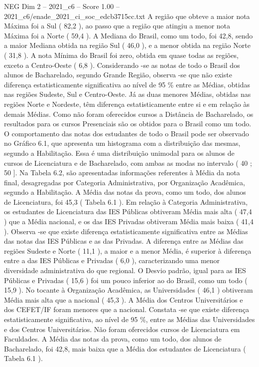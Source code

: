 \begin{textsample}{NEG Dim 2 – 2021\_c6 – Score 1.00 – 2021\_c6/enade\_2021\_ci\_soc\_edcb3715cc.txt}
A região que obteve a maior nota Máxima foi a Sul ( 82,2 ), ao passo que a região que atingiu a menor nota Máxima foi a Norte ( 59,4 ).
A Mediana do Brasil, como um todo, foi 42,8, sendo a maior Mediana obtida na região Sul ( 46,0 ), e a menor obtida na região Norte ( 31,8 ).
A nota Mínima do Brasil foi zero, obtida em quase todas as regiões, exceto a Centro-Oeste ( 6,8 ).
Considerando -se as notas de todo o Brasil dos alunos de Bacharelado, segundo Grande Região, observa -se que não existe diferença estatisticamente significativa ao nível de 95 \% entre as Médias, obtidas nas regiões Sudeste, Sul e Centro-Oeste.
Já as duas menores Médias, obtidas nas regiões Norte e Nordeste, têm diferença estatisticamente entre si e em relação às demais Médias.
Como não foram oferecidos cursos a Distância de Bacharelado, os resultados para os cursos Presenciais são os obtidos para o Brasil como um todo.
O comportamento das notas dos estudantes de todo o Brasil pode ser observado no Gráfico 6.1, que apresenta um histograma com a distribuição das mesmas, segundo a Habilitação.
Essa é uma distribuição unimodal para os alunos de cursos de Licenciatura e de Bacharelado, com ambas as modas no intervalo ( 40 ; 50 ].
Na Tabela 6.2, são apresentadas informações referentes à Média da nota final, desagregadas por Categoria Administrativa, por Organização Acadêmica, segundo a Habilitação.
A Média das notas da prova, como um todo, dos alunos de Licenciatura, foi 45,3 ( Tabela 6.1 ).
Em relação à Categoria Administrativa, os estudantes de Licenciatura das IES Públicas obtiveram Média mais alta ( 47,4 ) que a Média nacional, e os das IES Privadas obtiveram Média mais baixa ( 41,4 ).
Observa -se que existe diferença estatisticamente significativa entre as Médias das notas das IES Públicas e as das Privadas.
A diferença entre as Médias das regiões Sudeste e Norte ( 11,1 ), a maior e a menor Média, é superior à diferença entre a das IES Públicas e Privadas ( 6,0 ), caracterizando uma menor diversidade administrativa do que regional.
O Desvio padrão, igual para as IES Públicas e Privadas ( 15,6 ) foi um pouco inferior ao do Brasil, como um todo ( 15,9 ).
No tocante à Organização Acadêmica, as Universidades ( 46,1 ) obtiveram Média mais alta que a nacional ( 45,3 ).
A Média dos Centros Universitários e dos CEFET/IF foram menores que a nacional.
Constata -se que existe diferença estatisticamente significativa, ao nível de 95 \%, entre as Médias das Universidades e dos Centros Universitários.
Não foram oferecidos cursos de Licenciatura em Faculdades.
A Média das notas da prova, como um todo, dos alunos de Bacharelado, foi 42,8, mais baixa que a Média dos estudantes de Licenciatura ( Tabela 6.1 ).

\end{textsample}
